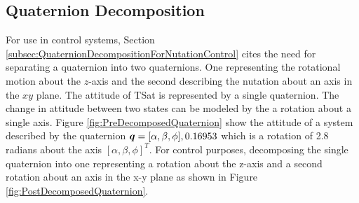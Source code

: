 


\subsection{Quaternion Decomposition}
\label{subsec:QuaternionDecomposition}

For use in control systems, Section \ref{subsec:QuaternionDecompositionForNutationControl} cites the need for separating a quaternion into two quaternions.  One representing the rotational motion about the $z$-axis and the second describing the nutation about an axis in the $xy$ plane.  The attitude of TSat is represented by a single quaternion.  The change in attitude between two states can be modeled by the a rotation about a single axis.  Figure \ref{fig:PreDecomposedQuaternion} show the attitude of a system described by the quaternion $\boldsymbol{q} = [\alpha, \beta, \phi], 0.16953$ which is a rotation of 2.8 radians about the axis $[\alpha, \beta, \phi]^T$.  For control purposes, decomposing the single quaternion into one representing a rotation about the z-axis and a second rotation about an axis in the x-y plane as shown in Figure \ref{fig:PostDecomposedQuaternion}.

